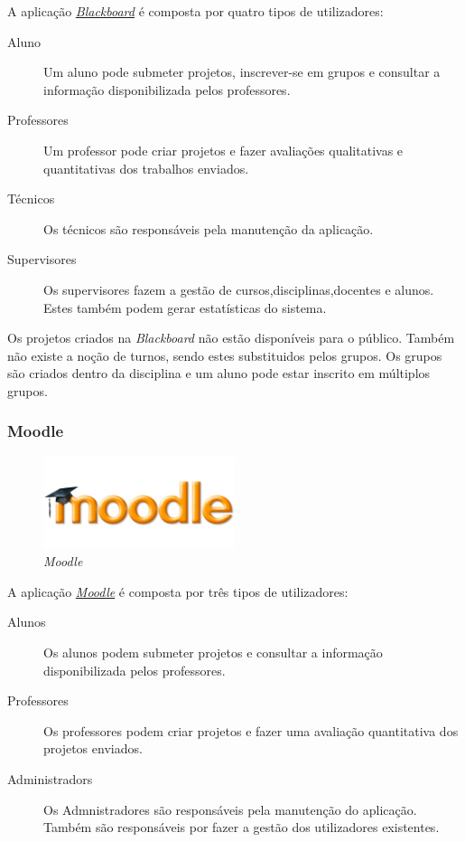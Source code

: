 A aplicação \href{http://www.blackboard.com}{\emph{Blackboard}} é composta por quatro tipos de utilizadores:
\begin{description}
	\item[Aluno] Um aluno pode submeter projetos, inscrever-se em grupos e consultar a informação disponibilizada pelos professores.
	\item[Professores] Um professor pode criar projetos e fazer avaliações qualitativas e quantitativas dos trabalhos enviados.
	\item[Técnicos] Os técnicos são responsáveis pela manutenção da aplicação.
	\item[Supervisores] Os supervisores fazem a gestão de cursos,disciplinas,docentes e alunos. Estes também podem gerar estatísticas do sistema.
\end{description}

Os projetos criados na \emph{Blackboard} não estão disponíveis para o público. Também não existe a noção de turnos, sendo estes substituidos pelos grupos. Os grupos são criados dentro da disciplina e um aluno pode estar inscrito em múltiplos grupos.

\subsubsection{Moodle} %
\label{ssub:moodle}
\begin{figure}[H]
        \centering
        \includegraphics[width=0.5\textwidth]{images/concorrencia/moodle.jpg}
         \caption{\emph{Moodle}}
         \label{fig: moodle}
\end{figure}
A aplicação \href{http://www.moodle.org}{\emph{Moodle}} é composta por três tipos de utilizadores:

\begin{description}
	\item[Alunos] Os alunos podem submeter projetos e consultar a informação disponibilizada pelos professores.
	\item[Professores] Os professores podem criar projetos e fazer uma avaliação quantitativa dos projetos enviados.
	\item[Administradors] Os Admnistradores são responsáveis pela manutenção do aplicação. Também são responsáveis por fazer a gestão dos utilizadores existentes.
\end{description}

